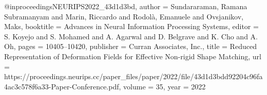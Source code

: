 @inproceedings{NEURIPS2022_43d1d3bd,
 author = {Sundararaman, Ramana Subramanyam and Marin, Riccardo and Rodol\`{a}, Emanuele and Ovsjanikov, Maks},
 booktitle = {Advances in Neural Information Processing Systems},
 editor = {S. Koyejo and S. Mohamed and A. Agarwal and D. Belgrave and K. Cho and A. Oh},
 pages = {10405--10420},
 publisher = {Curran Associates, Inc.},
 title = {Reduced Representation of Deformation Fields for Effective Non-rigid Shape Matching},
 url = {https://proceedings.neurips.cc/paper_files/paper/2022/file/43d1d3bdd92204c96fa4ac3c578f6a33-Paper-Conference.pdf},
 volume = {35},
 year = {2022}
}

